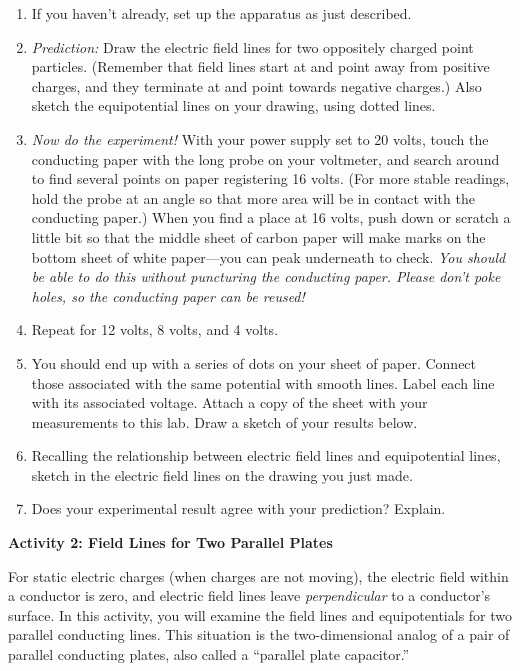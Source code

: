 \begin{enumerate}[labparts]
\item If you haven't already, set up the apparatus as just described.

\item \textit{Prediction:} Draw the electric field lines for two
oppositely charged point particles.  (Remember that field lines start at and point away from positive charges, and they terminate at and point towards negative charges.)  Also sketch the equipotential lines on your drawing, using dotted lines.
\answerspace{2in}

\item \textit{Now do the experiment!}  With your power supply set to 20 volts,
touch the conducting paper with the long probe on your voltmeter, and search around to find 
several points on 
paper registering 16 volts. (For more stable readings, hold the probe at an angle so that more area will be in contact with the conducting paper.)  When you find a place at 16 volts, push down or scratch a little bit 
so that the middle sheet of carbon paper will make marks on the bottom sheet of white paper---you 
can peak underneath to check.
\textit{You should be able to do this without puncturing the conducting paper.  Please don't poke holes, so the conducting paper can be reused!}

\item Repeat for 12 volts, 8 volts, and 4 volts.

\item You should end up with a series of dots on your sheet of paper. Connect
those associated with the same potential with smooth lines. Label each line 
with its associated voltage.  Attach a copy of the sheet with your measurements to this lab.
Draw a sketch of your results below.
\answerspace{2in}

\item Recalling the relationship between electric field lines and equipotential
lines, sketch in the electric field lines on the drawing you just made. 

\item Does your experimental result agree with your prediction? Explain.
\answerspace{1in}

\end{enumerate}

\pagebreak[2]
\textbf{Activity 2: Field Lines for Two Parallel Plates}

For static electric charges (when charges are not moving), the 
electric field within a conductor is zero, and electric field lines leave \textit{perpendicular} to a conductor's surface.  
In this activity, you will examine the field lines and equipotentials for two parallel conducting lines.  This situation is the two-dimensional analog of a pair of parallel conducting plates, also called a ``parallel plate capacitor.''


